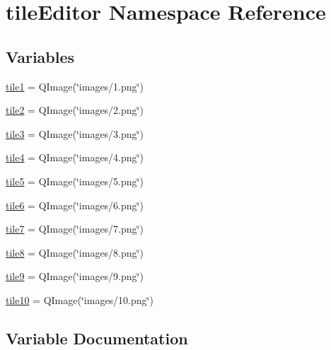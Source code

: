 \hypertarget{namespacetile_editor}{}\section{tile\+Editor Namespace Reference}
\label{namespacetile_editor}
\subsection*{Variables}
\begin{DoxyCompactItemize}
\item 
\mbox{\hyperlink{namespacetile_editor_a278504d24a2ccbaf2cc73c4b07530b6f}{tile1}} = Q\+Image(\char`\"{}images/1.png\char`\"{})
\item 
\mbox{\hyperlink{namespacetile_editor_a66d3a5472cadf985b7cb0b4da030a7fb}{tile2}} = Q\+Image(\char`\"{}images/2.png\char`\"{})
\item 
\mbox{\hyperlink{namespacetile_editor_a72df6660d2587b147b6a88fbe073857f}{tile3}} = Q\+Image(\char`\"{}images/3.png\char`\"{})
\item 
\mbox{\hyperlink{namespacetile_editor_a987733b8130a9627c65803fd878268af}{tile4}} = Q\+Image(\char`\"{}images/4.png\char`\"{})
\item 
\mbox{\hyperlink{namespacetile_editor_aa8f51dc2d83f2979ec5b3af33ed8b653}{tile5}} = Q\+Image(\char`\"{}images/5.png\char`\"{})
\item 
\mbox{\hyperlink{namespacetile_editor_a3f59cccf038a57b3256626054cec5096}{tile6}} = Q\+Image(\char`\"{}images/6.png\char`\"{})
\item 
\mbox{\hyperlink{namespacetile_editor_a1712ef4dbe11bfbb34f9e497664ad155}{tile7}} = Q\+Image(\char`\"{}images/7.png\char`\"{})
\item 
\mbox{\hyperlink{namespacetile_editor_a3ec756360968240f64b4783e696bfbca}{tile8}} = Q\+Image(\char`\"{}images/8.png\char`\"{})
\item 
\mbox{\hyperlink{namespacetile_editor_a56d11758002ce1e726a19b2da0b33cea}{tile9}} = Q\+Image(\char`\"{}images/9.png\char`\"{})
\item 
\mbox{\hyperlink{namespacetile_editor_a4f521722eb6ae5c8ce168c96f599e29c}{tile10}} = Q\+Image(\char`\"{}images/10.png\char`\"{})
\end{DoxyCompactItemize}


\subsection{Variable Documentation}
\mbox{\label{namespacetile_editor_a278504d24a2ccbaf2cc73c4b07530b6f}} 
